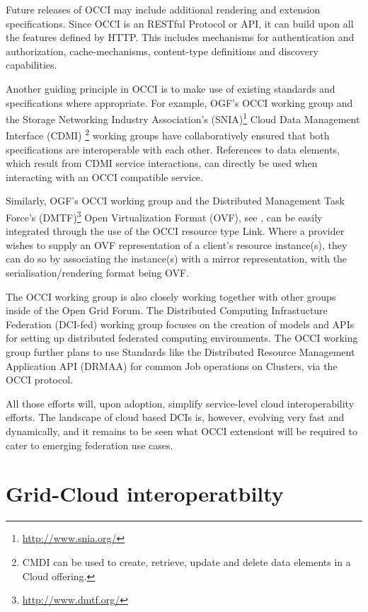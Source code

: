 \documentclass[10pt,conference,final,letterpaper,twoside,twocolumn,]{IEEEtran}
\begin{document}
 Future releases of OCCI may include additional rendering and
 extension specifications. Since OCCI is an RESTful Protocol or API,
 it can build upon all the features defined by HTTP. This includes
 mechanisms for authentication and authorization, cache-mechanisms,
 content-type definitions and discovery capabilities.

 Another guiding principle in OCCI is to make use of existing
 standards and specifications where appropriate.  For example, OGF's
 OCCI working group and the Storage Networking Industry Association's
 (SNIA)\footnote{\url{http://www.snia.org/}} Cloud Data Management
 Interface (CDMI) \footnote{CMDI can be used to create, retrieve,
 update and delete data elements in a Cloud offering.} working groups
 have collaboratively ensured that both specifications are
 interoperable with each other. 
 References to data elements, which result from CDMI service
 interactions, can directly be used when interacting with an OCCI
 compatible service.

 Similarly, OGF's OCCI working group and the Distributed Management
 Task Force's (DMTF)\footnote{\url{http://www.dmtf.org/}} Open
 Virtualization Format (OVF), see \cite{CDG+2009}, can be easily
 integrated through the use of the OCCI resource type Link. Where a
 provider wishes to supply an OVF representation of a client's
 resource instance(s), they can do so by associating the instance(s)
 with a mirror representation, with the serialisation/rendering format
 being OVF.

 The OCCI working group is also closely working together with other
 groups inside of the Open Grid Forum. The Distributed Computing
 Infrastucture Federation (DCI-fed) working group focuses on the
 creation of models and APIs for setting up distributed federated
 computing environments. The OCCI working group further plans to use
 Standards like the Distributed Resource Management Application API
 (DRMAA) for common Job operations on Clusters, via the OCCI protocol.

 All those efforts will, upon adoption, simplify service-level cloud
 interoperability efforts.  The landscape of cloud based DCIs is,
 however, evolving very fast and dynamically, and it remains to be
 seen what OCCI extensiont will be required to cater to emerging
 federation use cases.


\section{Grid-Cloud interoperatbilty}
\label{sec:gcinterop}
\end{document}
